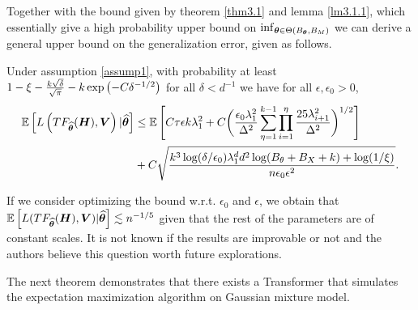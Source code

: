    Together with the bound given by theorem \ref{thm3.1} and lemma \ref{lm3.1.1}, which essentially give a high probability upper bound on $\inf_{\boldsymbol{\theta}\in\Theta(B_{\boldsymbol{\theta}},B_M)}$ we can derive a general upper bound on the generalization error, given as follows.
    \begin{corollary}
        Under assumption \ref{assump1}, with probability at least $1-\xi-\frac{k\sqrt\delta}{\sqrt\pi}-k\exp\left(-C\delta^{-1/2}\right)$ for all $\delta<d^{-1}$ we have for all $\epsilon,\epsilon_0>0$,
        \begin{align*}
            \mathbb{E}\left[L\left(TF_{\widehat{\boldsymbol{\theta}}}(\boldsymbol{H}),\boldsymbol{V}\right)|\widehat{\boldsymbol{\theta}}\right]&\leq \mathbb{E}\left[C\tau\epsilon k\lambda_1^2+C{\bigg (}\frac{\epsilon_0\lambda_1^2}{\Delta^2}\sum_{\eta=1}^{k-1}\prod_{i=1}^{\eta}\frac{25\lambda_{i+1}^2}{\Delta^2}{\bigg )}^{1/2}\right]\\
            &+C\sqrt{\frac{k^3\log(\delta/
            \epsilon_0)\lambda_1^d d^2\log(B_{\theta}+B_X+k)+\log(1/\xi)}{n\epsilon_0\epsilon^2}}.
        \end{align*}
    \end{corollary}
    \begin{remark}
        If we consider optimizing the bound w.r.t. $\epsilon_0$ and $\epsilon$, we obtain that $\mathbb{E}\left[L(TF_{\widehat{\boldsymbol{\theta}}}(\boldsymbol{H}),\boldsymbol{V})|\widehat{\boldsymbol{\theta}}\right]\lesssim n^{-1/5}$ given that the rest of the parameters are of constant scales. It is not known if the results are improvable or not and the authors believe this question worth future explorations.
    \end{remark}
The next theorem demonstrates that there exists a Transformer that simulates the expectation maximization algorithm on Gaussian mixture model.
\begin{theorem}
    
\end{theorem}
